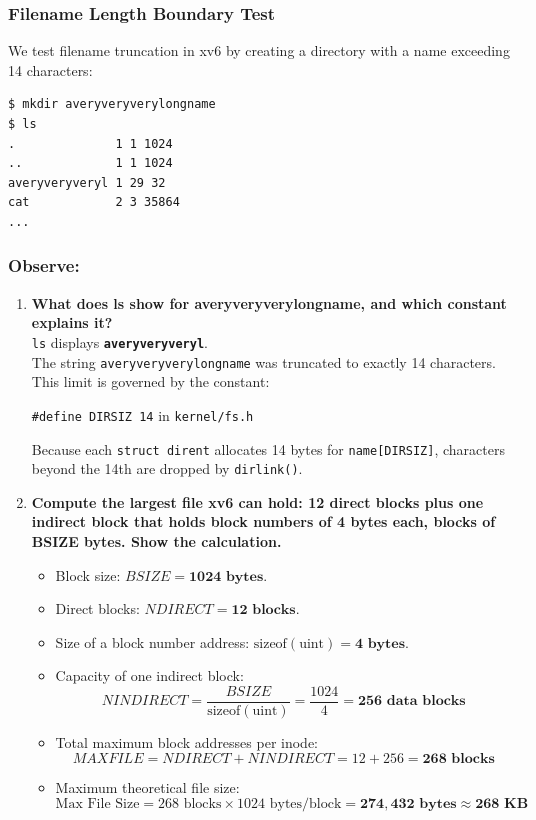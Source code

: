 \documentclass{labreport}
\begin{document}
\subsubsection{Filename Length Boundary Test}
We test filename truncation in xv6 by creating a directory with a name exceeding 14 characters:

\begin{lstlisting}[style=bash]
$ mkdir averyveryverylongname
$ ls
.              1 1 1024
..             1 1 1024
averyveryveryl 1 29 32
cat            2 3 35864
...
\end{lstlisting}

\subsubsection*{Observe:}
\begin{enumerate}[leftmargin=*]
    \item \textbf{What does ls show for averyveryverylongname, and which constant explains it?}\\[0.2em]
    \texttt{ls} displays \textbf{\texttt{averyveryveryl}}.\\
    The string \texttt{averyveryverylongname} was truncated to exactly 14 characters. This limit is governed by the constant:
    \begin{center}
    \texttt{\#define DIRSIZ 14} \quad in \texttt{kernel/fs.h}
    \end{center}
    Because each \texttt{struct dirent} allocates 14 bytes for \texttt{name[DIRSIZ]}, characters beyond the 14th are dropped by \texttt{dirlink()}.

    \item \textbf{Compute the largest file xv6 can hold: 12 direct blocks plus one indirect block that holds block numbers of 4 bytes each, blocks of BSIZE bytes. Show the calculation.}
    \begin{itemize}[noitemsep, topsep=2pt]
        \item Block size: $BSIZE = \mathbf{1024 \text{ bytes}}$.
        \item Direct blocks: $NDIRECT = \mathbf{12 \text{ blocks}}$.
        \item Size of a block number address: $\text{sizeof}(\text{uint}) = \mathbf{4 \text{ bytes}}$.
        \item Capacity of one indirect block:
        \[
        NINDIRECT = \frac{BSIZE}{\text{sizeof}(\text{uint})} = \frac{1024}{4} = \mathbf{256 \text{ data blocks}}
        \]
        \item Total maximum block addresses per inode:
        \[
        MAXFILE = NDIRECT + NINDIRECT = 12 + 256 = \mathbf{268 \text{ blocks}}
        \]
        \item Maximum theoretical file size:
        \[
        \text{Max File Size} = 268 \text{ blocks} \times 1024 \text{ bytes/block} = \mathbf{274,432 \text{ bytes}} \approx \mathbf{268 \text{ KB}}
        \]
    \end{itemize}


\end{enumerate}
\end{document}
